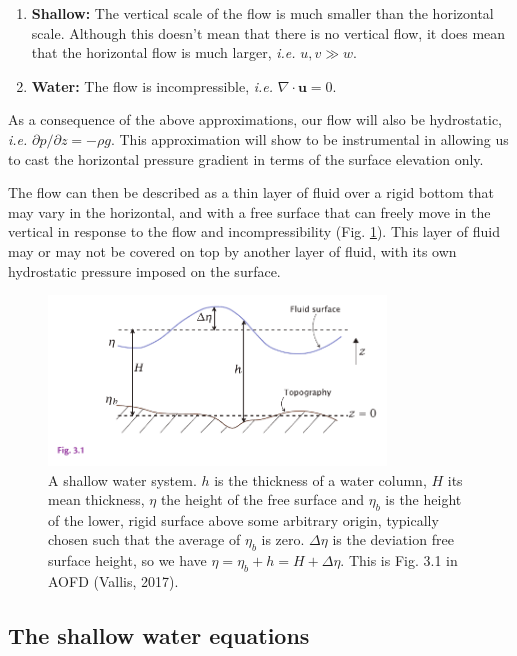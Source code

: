 \documentclass[12pt]{article}
\numberwithin{equation}{section}
\numberwithin{figure}{section}
\numberwithin{table}{section}
\begin{document}
\begin{enumerate}
  \item \textbf{Shallow:} The vertical scale of the flow is much smaller than the
    horizontal scale. Although this doesn't mean that there is no vertical
    flow, it does mean that the horizontal flow is much larger,
    \textit{i.e.} $u, v \gg w$.
  \item \textbf{Water:} The flow is incompressible, \textit{i.e.}
  $\nabla \cdot \mathbf{u} = 0$.
\end{enumerate}
As a consequence of the above approximations, our flow will also be hydrostatic,
\textit{i.e.} $\partial p / \partial z = -\rho g$.
This approximation will show to be instrumental in allowing us to cast the 
horizontal pressure gradient in terms of the surface elevation only.

The flow can then be described as a thin layer of fluid over a rigid bottom
that may vary in the horizontal, and with a free surface that can freely
move in the vertical in response to the flow and incompressibility
(Fig. \ref{fig:shallow_water1}).
This layer of fluid may or may not be covered on top by another layer of fluid,
with its own hydrostatic pressure imposed on the surface.

\begin{figure}[h]
  \centering
  \includegraphics[width=0.8\textwidth]{assets/fig_shallow_water1.pdf}
  \caption{
    A shallow water system.
    $h$ is the thickness of a water column, $H$ its mean thickness, $\eta$ the
    height of the free surface and $\eta_b$ is the height of the lower, rigid
    surface above some arbitrary origin, typically chosen such that the average
    of $\eta_b$ is zero.
    $\Delta \eta$ is the deviation free surface height, so we have
    $\eta = \eta_b + h = H + \Delta \eta$.
    This is Fig. 3.1 in AOFD (Vallis, 2017).
  }
  \label{fig:shallow_water1}
\end{figure}

\subsection{The shallow water equations}
\end{document}
